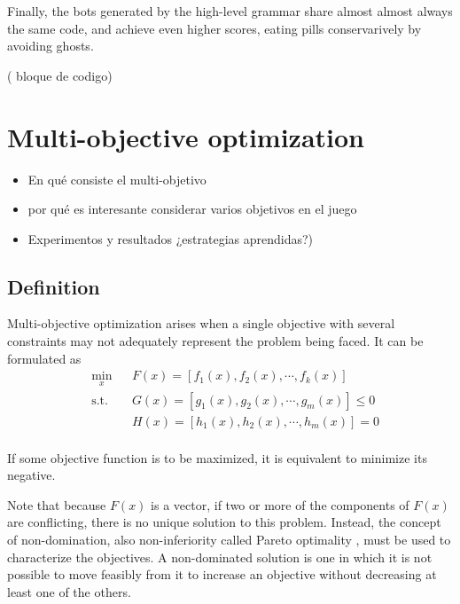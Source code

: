 \documentclass{llncs}
\begin{document}
Finally, the bots generated by the high-level grammar share almost almost always the same code, and achieve even higher scores, eating pills conservarively by avoiding ghosts.

({\color{red} bloque de codigo})

%
\section{Multi-objective optimization}
\label{sec:sec3}
%

\begin{itemize}
\item En qué consiste el multi-objetivo
\item por qué es interesante considerar varios objetivos en el juego
\item Experimentos y resultados  ¿estrategias aprendidas?)
\end{itemize}

\subsection{Definition}
Multi-objective optimization arises when a single objective with several constraints may not adequately represent the problem being faced. It can be formulated as
\begin{equation}
\begin{aligned}
& \underset{x}{\text{min}}
& & F(x) = [f_1(x), f_2(x), \cdots, f_k(x)] \\
& \text{s.t.} & &  G(x) = [g_1(x), g_2(x), \cdots, g_m(x)] \leq 0 \\
& & &  H(x) = [h_1(x), h_2(x), \cdots, h_m(x)] = 0 \\
\end{aligned}
\end{equation}

If some objective function is to be maximized, it is equivalent to minimize its negative.

Note that because $F(x)$ is a vector, if two or more of the components of $F(x)$ are conflicting, there is no unique solution to this problem. Instead, the concept of non-domination, also non-inferiority called Pareto optimality \cite{Censor:78}, must be used to characterize the objectives. A non-dominated solution is one in which it is not possible to move feasibly from it to increase an objective without decreasing at least one of the others.
\end{document}
